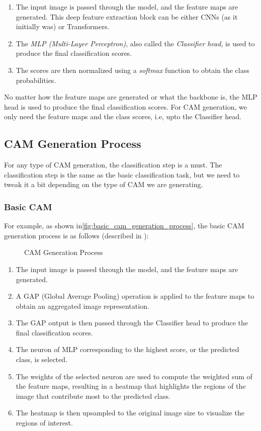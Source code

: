 \begin{enumerate}
    \item The input image is passed through the model, and the feature maps are generated. This deep feature extraction block can be either CNNs (as it initially was) or Transformers.
    \item The \emph{MLP (Multi-Layer Perceptron)}, also called the \emph{Classifier head}, is used to produce the final classification scores.
    \item The scores are then normalized using a \emph{softmax} function to obtain the class probabilities.
\end{enumerate}

No matter how the feature maps are generated or what the backbone is, the MLP head is used to produce the final classification scores. For CAM generation, we only need the feature maps and the class scores, i.e, upto the Classifier head.

\subsection{CAM Generation Process}
\label{subsec:cam_generation_process}

For any type of CAM generation, the classification step is a must. The classification step is the same as the basic classification task, but we need to tweak it a bit depending on the type of CAM we are generating.

\subsubsection{Basic CAM}

For example, as shown in\autoref{fig:basic_cam_generation_process}, the basic CAM generation process is as follows (described in \cite{cam}):
\begin{figure}[htbp]
    \centering
    \caption{CAM Generation Process}
    \label{fig:basic_cam_generation_process}
\end{figure}

\begin{enumerate}
    \item The input image is passed through the model, and the feature maps are generated.
    \item A GAP (Global Average Pooling) operation is applied to the feature maps to obtain an aggregated image representation.
    \item The GAP output is then passed through the Classifier head to produce the final classification scores.
    \item The neuron of MLP corresponding to the highest score, or the predicted class, is selected.
    \item The weights of the selected neuron are used to compute the weighted sum of the feature maps, resulting in a heatmap that highlights the regions of the image that contribute most to the predicted class.
    \item The heatmap is then upsampled to the original image size to visualize the regions of interest.
\end{enumerate}

